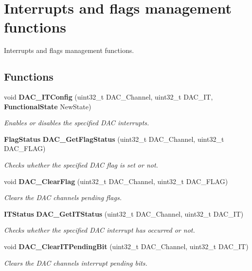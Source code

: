 \section{Interrupts and flags management functions}
\label{group__DAC__Group3}


Interrupts and flags management functions.  


\subsection*{Functions}
\begin{DoxyCompactItemize}
\item 
void \textbf{ D\+A\+C\+\_\+\+I\+T\+Config} (uint32\+\_\+t D\+A\+C\+\_\+\+Channel, uint32\+\_\+t D\+A\+C\+\_\+\+IT, \textbf{ Functional\+State} New\+State)
\begin{DoxyCompactList}\small\item\em Enables or disables the specified D\+AC interrupts. \end{DoxyCompactList}\item 
\textbf{ Flag\+Status} \textbf{ D\+A\+C\+\_\+\+Get\+Flag\+Status} (uint32\+\_\+t D\+A\+C\+\_\+\+Channel, uint32\+\_\+t D\+A\+C\+\_\+\+F\+L\+AG)
\begin{DoxyCompactList}\small\item\em Checks whether the specified D\+AC flag is set or not. \end{DoxyCompactList}\item 
void \textbf{ D\+A\+C\+\_\+\+Clear\+Flag} (uint32\+\_\+t D\+A\+C\+\_\+\+Channel, uint32\+\_\+t D\+A\+C\+\_\+\+F\+L\+AG)
\begin{DoxyCompactList}\small\item\em Clears the D\+AC channel\textquotesingle{}s pending flags. \end{DoxyCompactList}\item 
\textbf{ I\+T\+Status} \textbf{ D\+A\+C\+\_\+\+Get\+I\+T\+Status} (uint32\+\_\+t D\+A\+C\+\_\+\+Channel, uint32\+\_\+t D\+A\+C\+\_\+\+IT)
\begin{DoxyCompactList}\small\item\em Checks whether the specified D\+AC interrupt has occurred or not. \end{DoxyCompactList}\item 
void \textbf{ D\+A\+C\+\_\+\+Clear\+I\+T\+Pending\+Bit} (uint32\+\_\+t D\+A\+C\+\_\+\+Channel, uint32\+\_\+t D\+A\+C\+\_\+\+IT)
\begin{DoxyCompactList}\small\item\em Clears the D\+AC channel\textquotesingle{}s interrupt pending bits. \end{DoxyCompactList}\end{DoxyCompactItemize}


